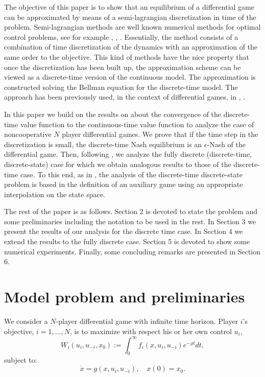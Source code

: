 \documentclass[12pt]{article}
\newcounter{remark}
\begin{document}
   The objective of this paper is to show that an equilibrium of a differential game can be approximated by means of a semi-lagrangian discretization in time of the problem. Semi-lagrangian methods are well known numerical methods for optimal control problems, see for example \cite{Bardi}, \cite{Falcone}, \cite{Falcone_Ferreti}. Essentially, the method consists of a combination of time discretization of the dynamics with an approximation of the same order to the objective. This kind of methods have the nice property that once the discretization has been built up, the approximation scheme can be viewed as a discrete-time version of the continuous model. The approximation is constructed solving the Bellman equation for the discrete-time model.  The approach has been previously used, in the context of differential games, in \cite{DeFrutos2015}, \cite{DeFrutos2016}.

   In this paper we build on the results on \cite{Bardi} about the convergence of the discrete-time value function to the continuous-time value function to analyze the case of noncooperative $N$ player differential games. We prove that if the time step in the discretization is small, the discrete-time Nash equilibrium is an $\epsilon$-Nash of the differential game. Then, following \cite{Javier_yo}, we
   analyze the fully discrete (discrete-time, discrete-state) case for which we obtain analogous results to those of the discrete-time case. To this end, as in \cite{Javier_yo}, the analysis of the discrete-time discrete-state problem is based in the definition of an  auxiliary game using an appropriate interpolation on the state space.

    The rest of the paper is as follows. Section 2 is devoted to state the problem and some preliminaries including the notation to be used in the rest. In Section 3 we present the results of our analysis for the discrete time case. In Section 4
    we extend the results to the fully discrete case. Section 5 is devoted to show some numerical experiments. Finally, some concluding remarks  are presented in Section 6.

\section{Model problem and preliminaries}
We consider a $N$-player differential game with infinite time horizon.
 Player $i$'s objective, $i=1,\dots, N$, is to maximize with respect his or her own control $u_i$,
\begin{equation}
W_i(u_i,u_{-i},x_0):=\int_0^\infty f_i(x,u_i,u_{-i})e^{-\rho t} dt,\label{objective}
\end{equation}
subject to:
\begin{equation}
\dot{x}=g(x,u_i,u_{-i}),\quad x(0)=x_0.\label{dynamics}
\end{equation}
\end{document}
